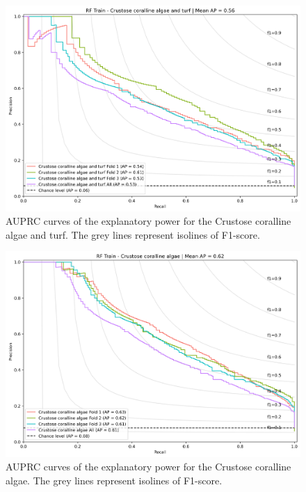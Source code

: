 \begin{figure}
\hypertarget{fig:chap3figS25}{%
\centering
\includegraphics{03-Chapitre3/figures/supplementary/03-precision_recall_curve_train_rf_Crustose coralline algae and turf.png}
\caption{AUPRC curves of the explanatory power for the Crustose
coralline algae and turf. The grey lines represent isolines of
F1-score.}\label{fig:chap3figS25}
}
\end{figure}

\begin{figure}
\hypertarget{fig:chap3figS26}{%
\centering
\includegraphics{03-Chapitre3/figures/supplementary/03-precision_recall_curve_train_rf_Crustose coralline algae.png}
\caption{AUPRC curves of the explanatory power for the Crustose
coralline algae. The grey lines represent isolines of
F1-score.}\label{fig:chap3figS26}
}
\end{figure}

